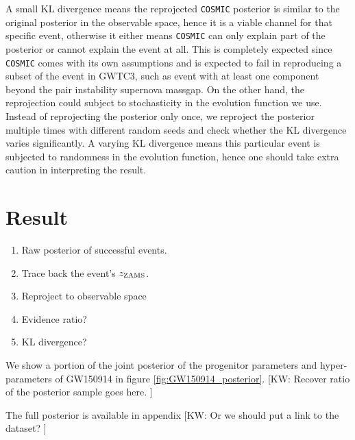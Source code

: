 \documentclass[twocolumn]{aastex631}
\newcommand{\kw}[1]{{\color{rb4}[KW: #1 ]}}
\begin{document}
A small KL divergence means the reprojected \texttt{COSMIC} posterior is similar to the original posterior in the observable space, hence it is a viable channel for that specific event, otherwise it either means \texttt{COSMIC} can only explain part of the posterior or cannot explain the event at all.
This is completely expected since \texttt{COSMIC} comes with its own assumptions and is expected to fail in reproducing a subset of the event in GWTC3, such as event with at least one component beyond the pair instability supernova massgap.
On the other hand, the reprojection could subject to stochasticity in the evolution function we use.
Instead of reprojecting the posterior only once, we reproject the posterior multiple times with different random seeds and check whether the KL divergence varies significantly.
A varying KL divergence means this particular event is subjected to randomness in the evolution function, hence one should take extra caution in interpreting the result.


\section{Result}
\label{sec:result}

\begin{enumerate}
\item Raw posterior of successful events.
\item Trace back the event's $z_{\rm ZAMS}$.
\item Reproject to observable space
\item Evidence ratio?
\item KL divergence?
\end{enumerate}


We show a portion of the joint posterior of the progenitor parameters and hyper-parameters of GW150914 in figure \ref{fig:GW150914_posterior}.
\kw{Recover ratio of the posterior sample goes here.}

The full posterior is available in appendix \kw{Or we should put a link to the dataset?}
\end{document}
